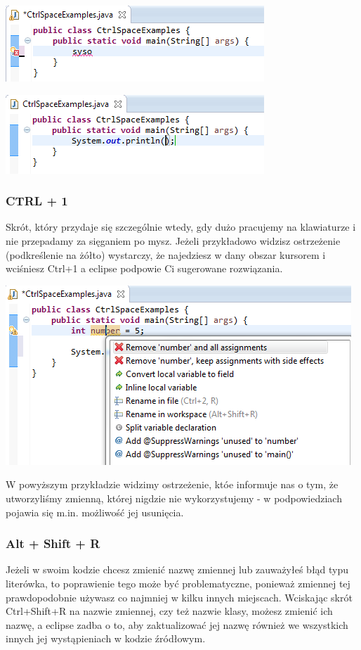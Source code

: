 \documentclass[letterpaper,10pt,english]{sphinxmanual}
\begin{document}
{\hfill\includegraphics{syso_1.png}\hfill}

{\hfill\includegraphics{syso_2.png}\hfill}


\subsubsection{CTRL + 1}
\label{wprowadzenie:ctrl-1}
Skrót, który przydaje się szczególnie wtedy, gdy dużo pracujemy na klawiaturze i nie przepadamy za sięganiem po mysz. Jeżeli przykładowo widzisz ostrzeżenie (podkreślenie na żółto) wystarczy, że najedziesz w dany obszar kursorem i wciśniesz Ctrl+1 a eclipse podpowie Ci sugerowane rozwiązania.

{\hfill\includegraphics{number_1.png}\hfill}

W powyższym przykładzie widzimy ostrzeżenie, któe informuje nas o tym, że utworzyliśmy zmienną, której nigdzie nie wykorzystujemy - w podpowiedziach pojawia się m.in. możliwość jej usunięcia.


\subsubsection{Alt + Shift + R}
\label{wprowadzenie:alt-shift-r}
Jeżeli w swoim kodzie chcesz zmienić nazwę zmiennej lub zauważyłeś błąd typu literówka, to poprawienie tego może być problematyczne, ponieważ zmiennej tej prawdopodobnie używasz co najmniej w kilku innych miejscach. Wciskając skrót Ctrl+Shift+R na nazwie zmiennej, czy też nazwie klasy, możesz zmienić ich nazwę, a eclipse zadba o to, aby zaktualizować jej nazwę również we wszystkich innych jej wystąpieniach w kodzie źródłowym.
\end{document}
